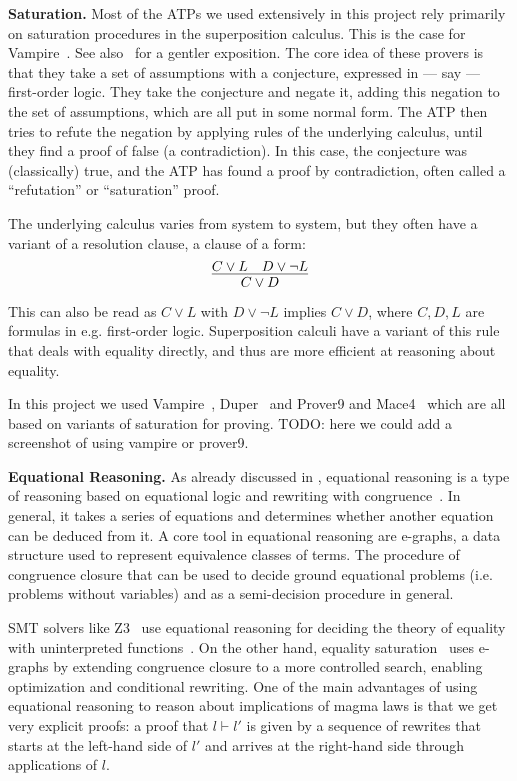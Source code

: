\textbf{Saturation.}
Most of the ATPs we used extensively in this project rely primarily on saturation procedures in the superposition calculus.
This is the case for Vampire~\cite{DBLP:conf/cav/KovacsV13}.
See also~\cite{DBLP:journals/cacm/BentkampBNTVW23} for a gentler exposition.
The core idea of these provers is that they take a set of assumptions with a conjecture, expressed in --- say --- first-order logic.
They take the conjecture and negate it, adding this negation to the set of assumptions, which are all put in some normal form.
The ATP then tries to refute the negation by applying rules of the underlying calculus, until they find a proof of false (a contradiction).
In this case, the conjecture was (classically) true, and the ATP has found a proof by contradiction, often called a ``refutation'' or ``saturation'' proof.

The underlying calculus varies from system to system, but they often have a variant of a resolution clause, a clause of a form:
\[\infer{C \lor D}{C \lor L \quad D \lor \neg L} \]
This can also be read as $C \lor L$ with $D \lor \neg L$ implies $C \lor D$, where $C, D, L$ are formulas in e.g. first-order logic.
Superposition calculi have a variant of this rule that deals with equality directly, and thus are more efficient at reasoning about equality.

In this project we used Vampire~\cite{DBLP:conf/cav/KovacsV13}, Duper~\cite{DBLP:conf/itp/CluneQBA24} and Prover9 and Mace4~\cite{prover9-mace4} which are all based on variants of saturation for proving.
TODO: here we could add a screenshot of using vampire or prover9.

\textbf{Equational Reasoning.} As already discussed in , equational reasoning is a type of reasoning based on equational logic and rewriting with congruence~\cite{term-rewriting}.
In general, it takes a series of equations and determines whether another equation can be deduced from it.
A core tool in equational reasoning are e-graphs, a data structure used to represent equivalence classes of terms.
The procedure of congruence closure that can be used to decide ground equational problems (i.e. problems without variables) and as a semi-decision procedure in general.

SMT solvers like Z3~\cite{DBLP:conf/tacas/MouraB08} use equational reasoning for deciding the theory of equality with uninterpreted functions~\cite{DBLP:series/txtcs/KroeningS16,DBLP:conf/cade/MouraB07}.
On the other hand, equality saturation~\cite{DBLP:journals/pacmpl/WillseyNWFTP21} uses e-graphs by extending congruence closure to a more controlled search, enabling optimization and conditional rewriting.
One of the main advantages of using equational reasoning to reason about implications of magma laws is that we get very explicit proofs: a proof that $l \vdash l'$ is given by a sequence of rewrites that starts at the left-hand side of $l'$ and arrives at the right-hand side through applications of $l$.

